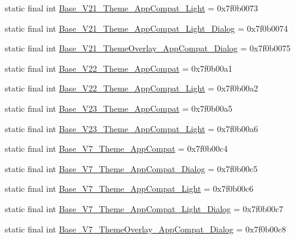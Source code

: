 \begin{CompactItemize}
\item 
static final int \hyperlink{classandroid_1_1support_1_1graphics_1_1drawable_1_1_r_1_1style_377ff4fee79a8cdee72abd04004570c5}{Base\_\-V21\_\-Theme\_\-AppCompat\_\-Light} = 0x7f0b0073
\item 
static final int \hyperlink{classandroid_1_1support_1_1graphics_1_1drawable_1_1_r_1_1style_31cebb33f5a244a5dc49982d121646ea}{Base\_\-V21\_\-Theme\_\-AppCompat\_\-Light\_\-Dialog} = 0x7f0b0074
\item 
static final int \hyperlink{classandroid_1_1support_1_1graphics_1_1drawable_1_1_r_1_1style_5adf44f0bf4c3bb1d5cc6ef69384e133}{Base\_\-V21\_\-ThemeOverlay\_\-AppCompat\_\-Dialog} = 0x7f0b0075
\item 
static final int \hyperlink{classandroid_1_1support_1_1graphics_1_1drawable_1_1_r_1_1style_841e993df317330513659223518e3b63}{Base\_\-V22\_\-Theme\_\-AppCompat} = 0x7f0b00a1
\item 
static final int \hyperlink{classandroid_1_1support_1_1graphics_1_1drawable_1_1_r_1_1style_dc6bbd6b3fad515226e6e4a0ada257b1}{Base\_\-V22\_\-Theme\_\-AppCompat\_\-Light} = 0x7f0b00a2
\item 
static final int \hyperlink{classandroid_1_1support_1_1graphics_1_1drawable_1_1_r_1_1style_8cc81d3d45f04a6f79c756e902565663}{Base\_\-V23\_\-Theme\_\-AppCompat} = 0x7f0b00a5
\item 
static final int \hyperlink{classandroid_1_1support_1_1graphics_1_1drawable_1_1_r_1_1style_060a78526c6a30ce7ccb690472d1c259}{Base\_\-V23\_\-Theme\_\-AppCompat\_\-Light} = 0x7f0b00a6
\item 
static final int \hyperlink{classandroid_1_1support_1_1graphics_1_1drawable_1_1_r_1_1style_260b7d5c484cba5402ee57a66b592168}{Base\_\-V7\_\-Theme\_\-AppCompat} = 0x7f0b00c4
\item 
static final int \hyperlink{classandroid_1_1support_1_1graphics_1_1drawable_1_1_r_1_1style_58b8f359d7f24c2b338b05f16629219a}{Base\_\-V7\_\-Theme\_\-AppCompat\_\-Dialog} = 0x7f0b00c5
\item 
static final int \hyperlink{classandroid_1_1support_1_1graphics_1_1drawable_1_1_r_1_1style_4e6297dd3bcedd2f32513532361bb645}{Base\_\-V7\_\-Theme\_\-AppCompat\_\-Light} = 0x7f0b00c6
\item 
static final int \hyperlink{classandroid_1_1support_1_1graphics_1_1drawable_1_1_r_1_1style_8299b8aeb07b2b8694a76951dd404bc8}{Base\_\-V7\_\-Theme\_\-AppCompat\_\-Light\_\-Dialog} = 0x7f0b00c7
\item 
static final int \hyperlink{classandroid_1_1support_1_1graphics_1_1drawable_1_1_r_1_1style_e3d44fd0ad4b5780b1beca99cb747fed}{Base\_\-V7\_\-ThemeOverlay\_\-AppCompat\_\-Dialog} = 0x7f0b00c8

\end{CompactItemize}
